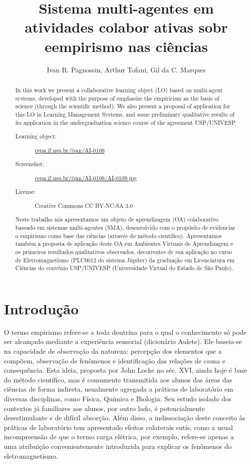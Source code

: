 \documentclass{article}
\title{Sistema multi-agentes em atividades colabor ativas sobr eempirismo nas ciências}
\author{Ivan R. Pagnossin\inst{1}, Arthur Tofani\inst{2}, Gil da C. Marques\inst{1}}
\begin{document}
\maketitle

\begin{abstract}
In this work we present a collaborative learning object (LO) based on multi-agent systems,
developed with the purpose of emphasize the empiricism as the basis of science (through the scientific method).
We also present a proposal of application for this LO in Learning Management Systems,
and some preliminary qualitative results of its application in the undergraduation science course of the agreement USP/UNIVESP.

\begin{description}
\item[Learning object:] \url{cepa.if.usp.br/ivan/AI-0109}
\item[Screenshot:] \url{cepa.if.usp.br/ivan/AI-0109/AI-0109.jpg}
\item[License:] Creative Commons CC BY-NC-SA 3.0
\end{description}
\end{abstract}

\begin{abstract}
Neste trabalho nós apresentamos um objeto de aprendizagem (OA) colaborativo baseado em sistemas multi-agentes (SMA),
desenvolvido com o propósito de evidenciar o empirismo como base das ciências (através do método científico).
Apresentamos também a proposta de aplicação deste OA em Ambientes Virtuais de Aprendizagem e os primeiros resultados qualitativos
observados, decorrentes de sua aplicação no curso de Eletromagnetismo (PLC0012 do sistema Júpiter) da graduação em
Licenciatura em Ciências do convênio USP/UNIVESP (Universidade Virtual do Estado de São Paulo).
\end{abstract}

\section{Introdução}

O termo empirismo refere-se a toda doutrina para o qual o conhecimento só pode
ser alcançado mediante a experiência sensorial (dicionário Aulete). Ele baseia-se
na capacidade de observação da natureza: percepção dos elementos que a compõem,
observação de fenômenos e identificação das relações de causa e consequência. Esta
ideia, proposta por John Locke no séc. XVI, ainda hoje é base do método científico,
mas é comumente transmitida aos alunos das áreas das ciências de forma indireta,
usualmente agregada a práticas de laboratório em diversas disciplinas, como Física,
Química e Biologia. Seu estudo isolado dos contextos já familiares aos alunos, por outro
lado, é potencialmente desestimulante e de difícil absorção. Além disso, a indissociação
deste conceito às práticas de laboratório tem apresentado efeitos colaterais sutís,
como a usual incompreensão de que o termo carga elétrica, por exemplo, refere-se
apenas a uma atribuição convenientemente introduzida para explicar os fenômenos do
eletromagnetismo.
\end{document}
